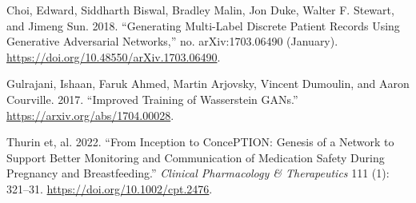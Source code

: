 \documentclass[
  letterpaper,
  DIV=11,
  numbers=noendperiod]{scrreprt}
\newlength{\cslhangindent}
\newlength{\cslentryspacingunit} %
\newenvironment{CSLReferences}[2] %
 {%
  \setlength{\parindent}{0pt}
  \ifodd #1
  \let\oldpar\par
  \def\par{\hangindent=\cslhangindent\oldpar}
  \fi
  \setlength{\parskip}{#2\cslentryspacingunit}
 }%
 {}
\begin{document}
\hypertarget{refs}{}
\begin{CSLReferences}{1}{0}
\leavevmode{}%
Choi, Edward, Siddharth Biswal, Bradley Malin, Jon Duke, Walter F.
Stewart, and Jimeng Sun. 2018. {``Generating Multi-Label Discrete
Patient Records Using Generative Adversarial Networks,''} no.
arXiv:1703.06490 (January).
\url{https://doi.org/10.48550/arXiv.1703.06490}.

\leavevmode{}%
Gulrajani, Ishaan, Faruk Ahmed, Martin Arjovsky, Vincent Dumoulin, and
Aaron Courville. 2017. {``Improved Training of Wasserstein GANs.''}
\url{https://arxiv.org/abs/1704.00028}.

\leavevmode{}%
Thurin et, al. 2022. {``From Inception to ConcePTION: Genesis of a
Network to Support Better Monitoring and Communication of Medication
Safety During Pregnancy and Breastfeeding.''} \emph{Clinical
Pharmacology \& Therapeutics} 111 (1): 321--31.
\url{https://doi.org/10.1002/cpt.2476}.

\end{CSLReferences}
\end{document}

